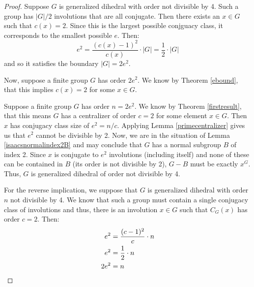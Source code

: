 \documentclass[main.tex]{subfiles}
\begin{document}
\begin{proof}
Suppose $G$ is generalized dihedral with order not divisible by 4. Such a group has $|G|/2$ involutions that are all conjugate. Then there exists an $x \in G$ such that $c(x) = 2$. Since this is the largest possible conjguacy class, it corresponds to the smallest possible $e$. Then:
$$e^2 = \frac{(c(x) - 1)^2}{c(x)} \cdot |G| = \frac{1}{2} \cdot |G|$$
and so it satisfies the boundary $|G| = 2e^2$.

Now, suppose a finite group $G$ has order $2e^2$. We know by Theorem \ref{ebound}, that this implies $c(x) = 2$ for some $x \in G$. 






Suppose a finite group $G$ has order $n = 2e^2$. We know by Theorem \ref{firstresult}, that this means
$G$ has a centralizer of order $c = 2$ for some element $x \in G$. Then $x$ has
conjugacy class size of $e^2 = n / c$. Applying Lemma \ref{primecentralizer}
gives us that $e^2$ cannot be divisible by 2. Now, we are in the situation of
Lemma \ref{isaacsnormalindex2B} and may conclude that $G$ has a normal subgroup
$B$ of index 2. Since $x$ is conjugate to $e^2$ involutions (including itself)
and none of these can be contained in $B$ (its order is not divisible by 2), $G
- B$ must be exactly $x^G$. Thus, $G$ is generalized dihedral of order not
divisible by 4.

For the reverse implication, we suppose that $G$ is generalized dihedral with
order $n$ not divisible by 4. We know that such a group must contain a single
conjugacy class of involutions and thus, there is an involution $x \in G$ such
that $C_G(x)$ has order $c = 2$. Then: \begin{align*} e^2 &= \frac{(c - 1)^2}{c}
\cdot n\\ e^2 &= \frac{1}{2} \cdot n\\ 2e^2 &= n \qedhere \end{align*}
\end{proof}
\end{document}
